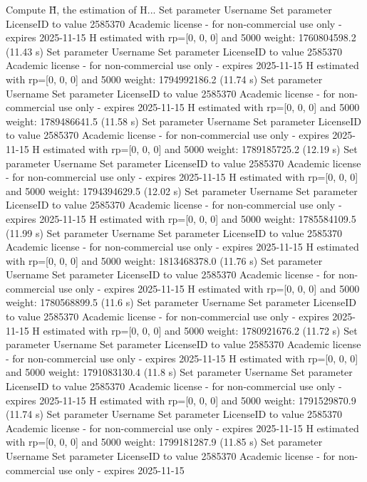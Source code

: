 Compute H̃, the estimation of H...
Set parameter Username
Set parameter LicenseID to value 2585370
Academic license - for non-commercial use only - expires 2025-11-15
  H estimated with rp=[0, 0, 0] and 5000 weight:  1760804598.2  (11.43 s)
Set parameter Username
Set parameter LicenseID to value 2585370
Academic license - for non-commercial use only - expires 2025-11-15
  H estimated with rp=[0, 0, 0] and 5000 weight:  1794992186.2  (11.74 s)
Set parameter Username
Set parameter LicenseID to value 2585370
Academic license - for non-commercial use only - expires 2025-11-15
  H estimated with rp=[0, 0, 0] and 5000 weight:  1789486641.5  (11.58 s)
Set parameter Username
Set parameter LicenseID to value 2585370
Academic license - for non-commercial use only - expires 2025-11-15
  H estimated with rp=[0, 0, 0] and 5000 weight:  1789185725.2  (12.19 s)
Set parameter Username
Set parameter LicenseID to value 2585370
Academic license - for non-commercial use only - expires 2025-11-15
  H estimated with rp=[0, 0, 0] and 5000 weight:  1794394629.5  (12.02 s)
Set parameter Username
Set parameter LicenseID to value 2585370
Academic license - for non-commercial use only - expires 2025-11-15
  H estimated with rp=[0, 0, 0] and 5000 weight:  1785584109.5  (11.99 s)
Set parameter Username
Set parameter LicenseID to value 2585370
Academic license - for non-commercial use only - expires 2025-11-15
  H estimated with rp=[0, 0, 0] and 5000 weight:  1813468378.0  (11.76 s)
Set parameter Username
Set parameter LicenseID to value 2585370
Academic license - for non-commercial use only - expires 2025-11-15
  H estimated with rp=[0, 0, 0] and 5000 weight:  1780568899.5  (11.6 s)
Set parameter Username
Set parameter LicenseID to value 2585370
Academic license - for non-commercial use only - expires 2025-11-15
  H estimated with rp=[0, 0, 0] and 5000 weight:  1780921676.2  (11.72 s)
Set parameter Username
Set parameter LicenseID to value 2585370
Academic license - for non-commercial use only - expires 2025-11-15
  H estimated with rp=[0, 0, 0] and 5000 weight:  1791083130.4  (11.8 s)
Set parameter Username
Set parameter LicenseID to value 2585370
Academic license - for non-commercial use only - expires 2025-11-15
  H estimated with rp=[0, 0, 0] and 5000 weight:  1791529870.9  (11.74 s)
Set parameter Username
Set parameter LicenseID to value 2585370
Academic license - for non-commercial use only - expires 2025-11-15
  H estimated with rp=[0, 0, 0] and 5000 weight:  1799181287.9  (11.85 s)
Set parameter Username
Set parameter LicenseID to value 2585370
Academic license - for non-commercial use only - expires 2025-11-15
